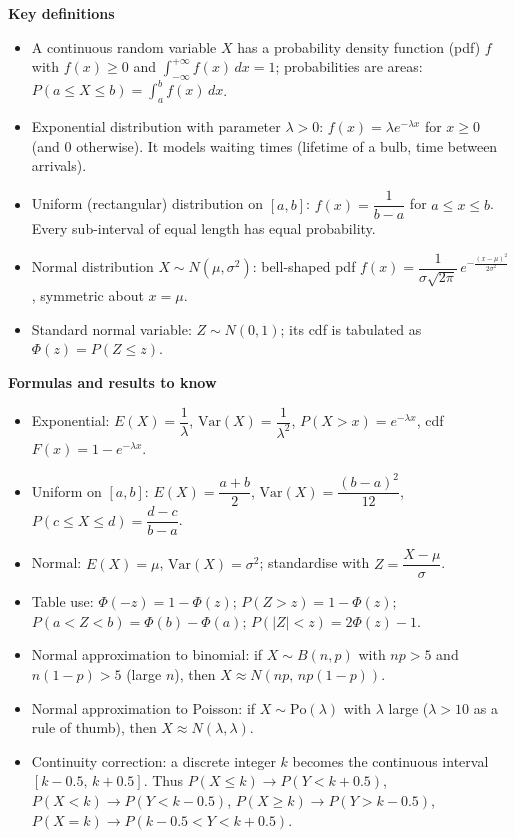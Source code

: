 \documentclass[11pt]{article}
\newcommand{\cle}[1]{{\popxbold\color{popdark}#1}}
\begin{document}
\begin{bilan}
\textbf{Key definitions}
\begin{itemize}
\item A \cle{continuous random variable} $X$ has a \cle{probability density function} (pdf) $f$ with $f(x)\geq 0$ and $\displaystyle\int_{-\infty}^{+\infty} f(x)\,dx = 1$; probabilities are areas: $P(a\leq X\leq b)=\displaystyle\int_a^b f(x)\,dx$.
\item \cle{Exponential distribution} with parameter $\lambda>0$: $f(x)=\lambda e^{-\lambda x}$ for $x\geq 0$ (and $0$ otherwise). It models waiting times (lifetime of a bulb, time between arrivals).
\item \cle{Uniform (rectangular) distribution} on $[a,b]$: $f(x)=\dfrac{1}{b-a}$ for $a\leq x\leq b$. Every sub-interval of equal length has equal probability.
\item \cle{Normal distribution} $X\sim N(\mu,\sigma^{2})$: bell-shaped pdf $f(x)=\dfrac{1}{\sigma\sqrt{2\pi}}\,e^{-\frac{(x-\mu)^{2}}{2\sigma^{2}}}$, symmetric about $x=\mu$.
\item \cle{Standard normal variable}: $Z\sim N(0,1)$; its cdf is tabulated as $\Phi(z)=P(Z\leq z)$.
\end{itemize}

\textbf{Formulas and results to know}
\begin{itemize}
\item Exponential: $E(X)=\dfrac{1}{\lambda}$, $\mathrm{Var}(X)=\dfrac{1}{\lambda^{2}}$, $P(X>x)=e^{-\lambda x}$, cdf $F(x)=1-e^{-\lambda x}$.
\item Uniform on $[a,b]$: $E(X)=\dfrac{a+b}{2}$, $\mathrm{Var}(X)=\dfrac{(b-a)^{2}}{12}$, $P(c\leq X\leq d)=\dfrac{d-c}{b-a}$.
\item Normal: $E(X)=\mu$, $\mathrm{Var}(X)=\sigma^{2}$; standardise with $Z=\dfrac{X-\mu}{\sigma}$.
\item Table use: $\Phi(-z)=1-\Phi(z)$; $P(Z>z)=1-\Phi(z)$; $P(a<Z<b)=\Phi(b)-\Phi(a)$; $P(|Z|<z)=2\Phi(z)-1$.
\item Normal approximation to binomial: if $X\sim B(n,p)$ with $np>5$ and $n(1-p)>5$ (large $n$), then $X\approx N(np,\,np(1-p))$.
\item Normal approximation to Poisson: if $X\sim \mathrm{Po}(\lambda)$ with $\lambda$ large ($\lambda>10$ as a rule of thumb), then $X\approx N(\lambda,\lambda)$.
\item \cle{Continuity correction}: a discrete integer $k$ becomes the continuous interval $[k-0.5,\,k+0.5]$. Thus $P(X\leq k)\to P(Y<k+0.5)$, $P(X<k)\to P(Y<k-0.5)$, $P(X\geq k)\to P(Y>k-0.5)$, $P(X=k)\to P(k-0.5<Y<k+0.5)$.
\end{itemize}


\end{bilan}
\end{document}
